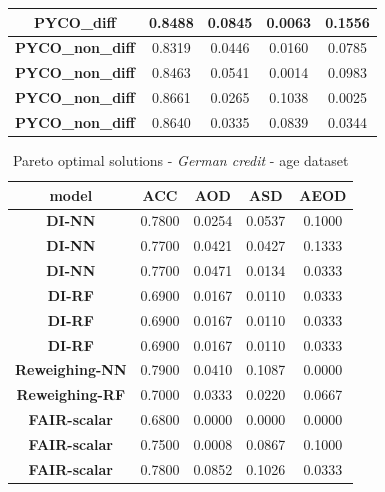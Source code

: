 \documentclass[preprint,12pt]{elsarticle}
\begin{document}
\begin{table}
\begin{tabular}{|c|c|c|c|c|}
		\textbf{PYCO\_diff}      & 0.8488       & 0.0845       & 0.0063       & 0.1556        \\ \hline
		\textbf{PYCO\_non\_diff} & 0.8319       & 0.0446       & 0.0160       & 0.0785        \\ \hline
		\textbf{PYCO\_non\_diff} & 0.8463       & 0.0541       & 0.0014       & 0.0983        \\ \hline
		\textbf{PYCO\_non\_diff} & 0.8661       & 0.0265       & 0.1038       & 0.0025        \\ \hline
		\textbf{PYCO\_non\_diff} & 0.8640       & 0.0335       & 0.0839       & 0.0344        \\ \hline
	\end{tabular}
	\label{tab:MEPS-19}%
\end{table}


\begin{table}
	\centering
	\caption{Pareto optimal solutions - \textit{German credit} - age dataset}
	\begin{tabular}{|c|c|c|c|c|}
		\hline
		\textbf{model}          & \textbf{ACC} & \textbf{AOD} & \textbf{ASD} & \textbf{AEOD} \\ \hline
		\textbf{DI-NN}          & 0.7800       & 0.0254       & 0.0537       & 0.1000        \\ \hline
		\textbf{DI-NN}          & 0.7700       & 0.0421       & 0.0427       & 0.1333        \\ \hline
		\textbf{DI-NN}          & 0.7700       & 0.0471       & 0.0134       & 0.0333        \\ \hline
		\textbf{DI-RF}          & 0.6900       & 0.0167       & 0.0110       & 0.0333        \\ \hline
		\textbf{DI-RF}          & 0.6900       & 0.0167       & 0.0110       & 0.0333        \\ \hline
		\textbf{DI-RF}          & 0.6900       & 0.0167       & 0.0110       & 0.0333        \\ \hline
		\textbf{Reweighing-NN}  & 0.7900       & 0.0410       & 0.1087       & 0.0000        \\ \hline
		\textbf{Reweighing-RF}  & 0.7000       & 0.0333       & 0.0220       & 0.0667        \\ \hline
		\textbf{FAIR-scalar}    & 0.6800       & 0.0000       & 0.0000       & 0.0000        \\ \hline
		\textbf{FAIR-scalar}    & 0.7500       & 0.0008       & 0.0867       & 0.1000        \\ \hline
		\textbf{FAIR-scalar}    & 0.7800       & 0.0852       & 0.1026       & 0.0333        \\ \hline

\end{tabular}
\end{table}
\end{document}
